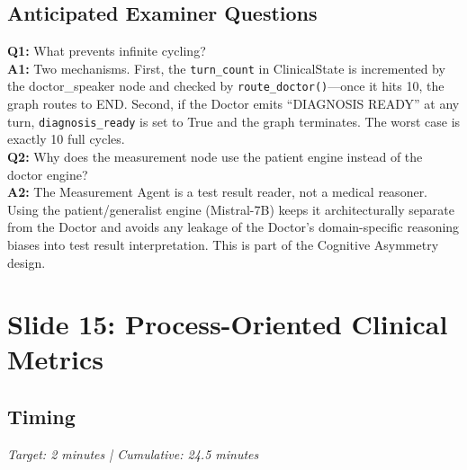 \documentclass[12pt]{article}
\begin{document}
  \subsection*{Anticipated Examiner Questions}
  \begin{qabox}
  \textbf{Q1:} What prevents infinite cycling? \\
  \textbf{A1:} Two mechanisms. First, the \texttt{turn\_count} in ClinicalState is incremented by the doctor\_speaker node and checked by \texttt{route\_doctor()}---once it hits 10, the graph routes to END. Second, if the Doctor emits ``DIAGNOSIS READY'' at any turn, \texttt{diagnosis\_ready} is set to True and the graph terminates. The worst case is exactly 10 full cycles. \\[6pt]
  \textbf{Q2:} Why does the measurement node use the patient engine instead of the doctor engine? \\
  \textbf{A2:} The Measurement Agent is a test result reader, not a medical reasoner. Using the patient/generalist engine (Mistral-7B) keeps it architecturally separate from the Doctor and avoids any leakage of the Doctor's domain-specific reasoning biases into test result interpretation. This is part of the Cognitive Asymmetry design.
  \end{qabox}



  \section{Slide 15: Process-Oriented Clinical Metrics}

  \subsection*{Timing}
  \textit{Target: 2 minutes | Cumulative: 24.5 minutes}
\end{document}
